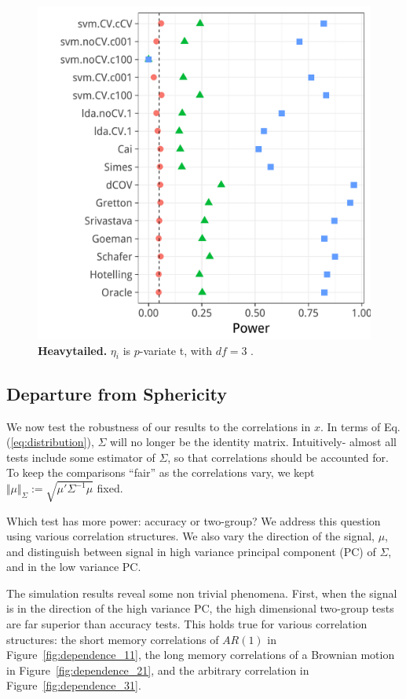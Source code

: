 \documentclass[journal]{IEEEtran}
\begin{document}
\begin{figure}[th]
	\centering
	\includegraphics[width=0.7\columnwidth]{"art/file9"}
	\caption{\textbf{Heavytailed.} $\eta_i$ is $p$-variate t, with $df=3$ .  } 
	\label{fig:t_null}
\end{figure}




\subsection{Departure from Sphericity}
\label{sec:dependence}

We now test the robustness of our results to the correlations in $x$. 
In terms of Eq.(\ref{eq:distribution}), $\Sigma$ will no longer be the identity matrix. 
Intuitively- almost all tests include some estimator of $\Sigma$, so that correlations should be accounted for.
To keep the comparisons ``fair'' as the correlations vary, we kept $\Vert \mu \Vert_\Sigma:=\sqrt{\mu'\Sigma^{-1}\mu}$ fixed. 

Which test has more power: accuracy or two-group?
We address this question using various correlation structures.
We also vary the direction of the signal, $\mu$, and distinguish between signal in high variance principal component (PC) of $\Sigma$, and in the low variance PC. 

The simulation results reveal some non trivial phenomena.
First, when the signal is in the direction of the high variance PC, the high dimensional two-group tests are far superior than accuracy tests. 
This holds true for various correlation structures: the short memory correlations of $AR(1)$ in Figure~\ref{fig:dependence_11}, the long memory correlations of a Brownian motion in Figure~\ref{fig:dependence_21}, and the arbitrary correlation in Figure~\ref{fig:dependence_31}.
\end{document}
